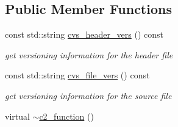 \subsection*{Public Member Functions}
\begin{DoxyCompactItemize}
\item 
const std\-::string \hyperlink{classc2__function_a851a9e8dca6e8fa9c2da12c8705566b2}{cvs\-\_\-header\-\_\-vers} () const 
\begin{DoxyCompactList}\small\item\em get versioning information for the header file \end{DoxyCompactList}\item 
const std\-::string \hyperlink{classc2__function_a2304b7543724be829571336da02b0f91}{cvs\-\_\-file\-\_\-vers} () const 
\begin{DoxyCompactList}\small\item\em get versioning information for the source file \end{DoxyCompactList}\item 
\hypertarget{classc2__function_ab17870e5af508c66ec154195b837466e}{virtual \hyperlink{classc2__function_ab17870e5af508c66ec154195b837466e}{$\sim$c2\-\_\-function} ()}\label{classc2__function_ab17870e5af508c66ec154195b837466e}


\end{DoxyCompactItemize}
